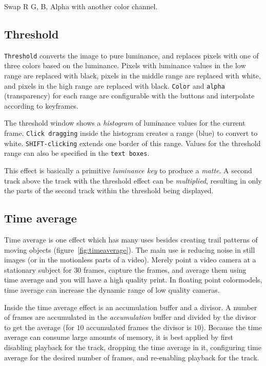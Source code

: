 Swap R G, B, Alpha with another color channel.

\subsection{Threshold}%
\label{sub:threshold}

\texttt{Threshold} converts the image to pure luminance, and replaces pixels with one of three colors based on the luminance. Pixels with luminance values in the low range are replaced with black, pixels in the middle range are replaced with white, and pixels in the high range are replaced with black. \texttt{Color} and \texttt{alpha} (transparency) for each range are configurable with the buttons and interpolate according to keyframes.

The threshold window shows a \textit{histogram} of luminance values for the current frame. \texttt{Click dragging} inside the histogram creates a range (blue) to convert to white. \texttt{SHIFT-clicking} extends one border of this range. Values for the threshold range can also be specified in the \texttt{text boxes}.

This effect is basically a primitive \textit{luminance key} to produce a \textit{matte}. A second track above the track with the threshold effect can be \textit{multiplied}, resulting in only the parts of the second track within the threshold being displayed.

\subsection{Time average}%
\label{sub:time_average}

Time average is one effect which has many uses besides creating trail patterns of moving objects (figure~\ref{fig:timeaverage}).
The main use is reducing noise in still images (or in the motionless parts of a video). Merely point a video camera at a stationary subject for $30$ frames, capture the frames, and average them using time average and you will have a high quality print. In floating point colormodels, time average can increase the dynamic range of low quality cameras.

Inside the time average effect is an accumulation buffer and a divisor. A number of frames are accumulated in the \textit{accumulation} buffer and divided by the divisor to get the average (for $10$ accumulated frames the divisor is $10$). Because the time average can consume large amounts of memory, it is best applied by first disabling playback for the track, dropping the time average in it, configuring time average for the desired number of frames, and re-enabling playback for the track.

